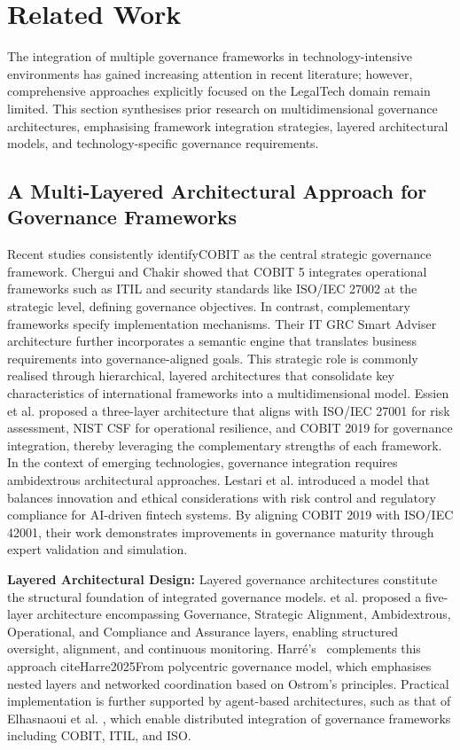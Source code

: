 \documentclass{IET-Conf-Paper}
\begin{document}
\section{Related Work}
    The integration of multiple governance frameworks in technology-intensive environments has gained increasing attention in recent literature; however, comprehensive approaches explicitly focused on the LegalTech domain remain limited. This section synthesises prior research on multidimensional governance architectures, emphasising framework integration strategies, layered architectural models, and technology-specific governance requirements.
    \vspace{-1mm}
    \subsection{A Multi-Layered Architectural Approach for Governance Frameworks}
    Recent studies consistently identifyCOBIT as the central strategic governance framework\cite{Chergui2020IT, Essien2022Optimizing, Lestari2025Designing}. Chergui and Chakir \cite{Chergui2020IT} showed that COBIT 5 integrates operational frameworks such as ITIL and security standards like ISO/IEC 27002 at the strategic level, defining governance objectives. In contrast, complementary frameworks specify implementation mechanisms. Their IT GRC Smart Adviser architecture further incorporates a semantic engine that translates business requirements into governance-aligned goals.
    This strategic role is commonly realised through hierarchical, layered architectures that consolidate key characteristics of international frameworks into a multidimensional model. Essien et al. \cite{Essien2022Optimizing} proposed a three-layer architecture that aligns with ISO/IEC 27001 for risk assessment, NIST CSF for operational resilience, and COBIT 2019 for governance integration, thereby leveraging the complementary strengths of each framework.
    In the context of emerging technologies, governance integration requires ambidextrous architectural approaches. Lestari et al. \cite{Lestari2025Designing} introduced a model that balances innovation and ethical considerations with risk control and regulatory compliance for AI-driven fintech systems. By aligning COBIT 2019 with ISO/IEC 42001, their work demonstrates improvements in governance maturity through expert validation and simulation.
    
    \textbf{Layered Architectural Design: }
    Layered governance architectures constitute the structural foundation of integrated governance models. et al. \cite{Lestari2025Designing} proposed a five-layer architecture encompassing Governance, Strategic Alignment, Ambidextrous, Operational, and Compliance and Assurance layers, enabling structured oversight, alignment, and continuous monitoring. Harré’s \ complements this approach cite{Harre2025From} polycentric governance model, which emphasises nested layers and networked coordination based on Ostrom’s principles. Practical implementation is further supported by agent-based architectures, such as that of Elhasnaoui et al. \cite{Soukaina_Elhasnaoui_2014}, which enable distributed integration of governance frameworks including COBIT, ITIL, and ISO.
    
\end{document}
